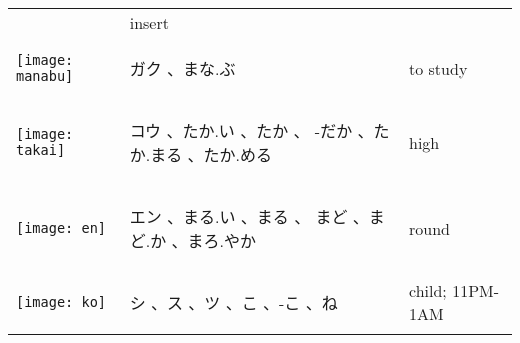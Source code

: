 \documentclass[a4paper,12pt]{extarticle}
\begin{document}
\begin{longtable}{|lp{6cm}p{4cm}|}
	                                   &
	insert
	\\
	\begin{minipage}{0.3\textwidth}
		\centerline{
			\texttt{[image: manabu]}
		}
	\end{minipage}
	                                   &
	\begin{CJK}{UTF8}{min}ガク 、まな.ぶ\end{CJK}
	                                   &
	to study
	\\
	\begin{minipage}{0.3\textwidth}
		\centerline{
			\texttt{[image: takai]}
		}
	\end{minipage}
	                                   &
	\begin{CJK}{UTF8}{min} コウ 、たか.い 、たか 、 -だか 、たか.まる  、たか.める\end{CJK}
	                                   &
	high
	\\
	\begin{minipage}{0.3\textwidth}
		\centerline{
			\texttt{[image: en]}
		}
	\end{minipage}
	                                   &
	\begin{CJK}{UTF8}{min} エン 、まる.い 、まる 、 まど 、まど.か 、まろ.やか\end{CJK}
	                                   &
	round
	\\
	\begin{minipage}{0.3\textwidth}
		\centerline{
			\texttt{[image: ko]}
		}
	\end{minipage}
	                                   &
	\begin{CJK}{UTF8}{min} シ 、ス 、ツ 、こ 、-こ 、ね\end{CJK}
	                                   &
	child; 11PM-1AM
	\\

\end{longtable}
\end{document}
